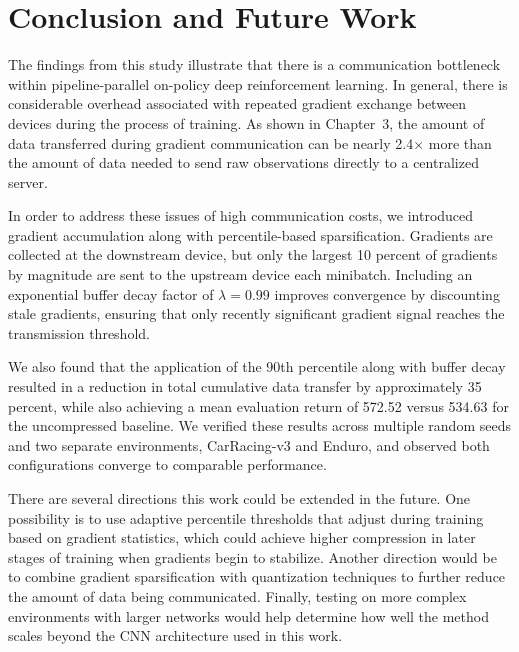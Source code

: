 \chapter{Conclusion and Future Work}

The findings from this study illustrate that there is a communication bottleneck within pipeline-parallel on-policy deep reinforcement learning. In general, there is considerable overhead associated with repeated gradient exchange between devices during the process of training. As shown in Chapter~3, the amount of data transferred during gradient communication can be nearly 2.4$\times$ more than the amount of data needed to send raw observations directly to a centralized server.

In order to address these issues of high communication costs, we introduced gradient accumulation along with percentile-based sparsification. Gradients are collected at the downstream device, but only the largest 10 percent of gradients by magnitude are sent to the upstream device each minibatch. Including an exponential buffer decay factor of $\lambda = 0.99$ improves convergence by discounting stale gradients, ensuring that only recently significant gradient signal reaches the transmission threshold.

We also found that the application of the 90th percentile along with buffer decay resulted in a reduction in total cumulative data transfer by approximately 35 percent, while also achieving a mean evaluation return of 572.52 versus 534.63 for the uncompressed baseline. We verified these results across multiple random seeds and two separate environments, CarRacing-v3 and Enduro, and observed both configurations converge to comparable performance.

There are several directions this work could be extended in the future. One possibility is to use adaptive percentile thresholds that adjust during training based on gradient statistics, which could achieve higher compression in later stages of training when gradients begin to stabilize. Another direction would be to combine gradient sparsification with quantization techniques to further reduce the amount of data being communicated. Finally, testing on more complex environments with larger networks would help determine how well the method scales beyond the CNN architecture used in this work.
